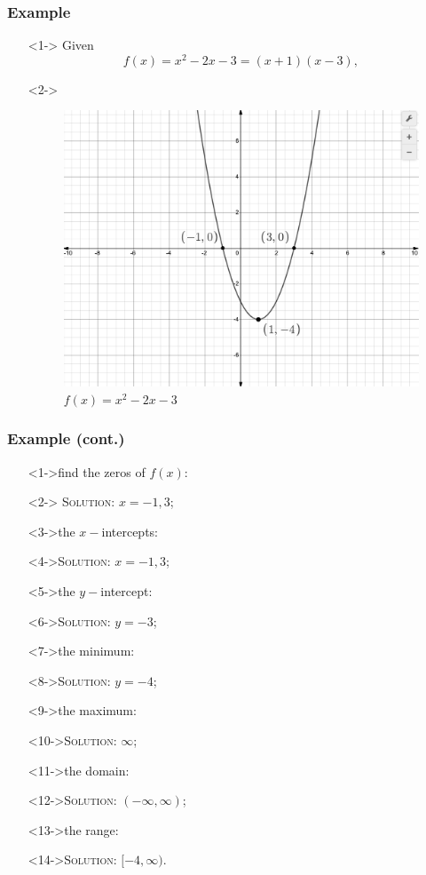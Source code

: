 \documentclass{beamer}
\begin{document}
\begin{frame}
	\frametitle{Example}
	\begin{enumerate}
		\item[]<1-> Given
		\[
			f(x)=x^{2}-2x-3=(x+1)(x-3),
		\]
		\item[]<2->
		\begin{figure}
			\begin{center}
				\caption{$f(x)=x^{2}-2x-3$}
				\includegraphics[scale=0.2]{4_1_025.png}
			\end{center}
		\end{figure}
	\end{enumerate}
\end{frame}

\begin{frame}
	\frametitle{Example (cont.)}
		\begin{enumerate}
			\item[]<1->find the zeros of $f(x)$:
			\item[]<2-> \textsc{Solution:} $x=-1, 3$;
			\item[]<3->the $x-$intercepts:
			\item[]<4->\textsc{Solution:} $x=-1, 3$;
			\item[]<5->the $y-$intercept:
			\item[]<6->\textsc{Solution:} $y=-3$;
			\item[]<7->the minimum:
			\item[]<8->\textsc{Solution:} $y=-4$;
			\item[]<9->the maximum:
			\item[]<10->\textsc{Solution:} $\infty$;
			\item[]<11->the domain:
			\item[]<12->\textsc{Solution:} $(-\infty, \infty)$;
			\item[]<13->the range:
			\item[]<14->\textsc{Solution:} $[-4, \infty)$.
		\end{enumerate}
\end{frame}
\end{document}

